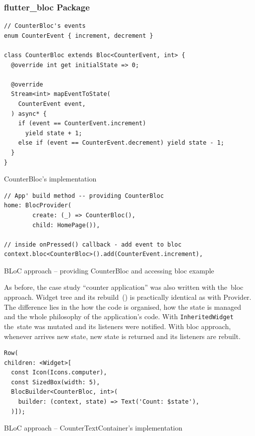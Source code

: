 \subsubsection{flutter\_bloc Package}
\begin{listing}[ht]
\begin{verbatim}
// CounterBloc's events
enum CounterEvent { increment, decrement }

class CounterBloc extends Bloc<CounterEvent, int> {
  @override int get initialState => 0;

  @override
  Stream<int> mapEventToState(
    CounterEvent event,
  ) async* {
    if (event == CounterEvent.increment)
      yield state + 1;
    else if (event == CounterEvent.decrement) yield state - 1;
  }
}
\end{verbatim}
\caption{CounterBloc's implementation}
\label{listing:counter-bloc-bloc}
\end{listing}

\begin{listing}[ht]
\begin{verbatim}
// App' build method -- providing CounterBloc
home: BlocProvider(
        create: (_) => CounterBloc(),
        child: HomePage()),
        
// inside onPressed() callback - add event to bloc
context.bloc<CounterBloc>().add(CounterEvent.increment),
\end{verbatim}
\caption{BLoC approach -- providing CounterBloc and accessing bloc example}
\label{listing:counter-bloc-homepage}
\end{listing}

As before, the case study ``counter application'' was also written with the~\gls{bloc} approach. Widget tree and its rebuild~() is practically identical as with Provider. The difference lies in the how the code is organised, how the state is managed and the whole philosophy of the application's code. With \verb|InheritedWidget| the~state was mutated and its listeners were notified. With \gls{bloc} approach, whenever arrives new state, new state is returned and its listeners are rebuilt. 

\begin{listing}[ht]
\begin{verbatim}
Row(
children: <Widget>[
  const Icon(Icons.computer),
  const SizedBox(width: 5),
  BlocBuilder<CounterBloc, int>(
    builder: (context, state) => Text('Count: $state'),
  )]);
\end{verbatim}
\caption{BLoC approach -- CounterTextContainer's implementation}
\label{listing:counter-bloc-counter-text}
\end{listing}

